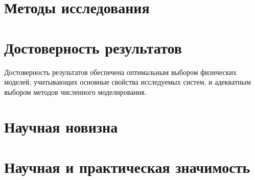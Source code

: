 \section{Методы исследования}

\section{Достоверность результатов}

Достоверность результатов обеспечена оптимальным выбором физических моделей, 
учитывающих основные свойства исследуемых систем, и адекватным выбором 
методов численного моделирования.

\section{Научная новизна}

\section{Научная и практическая значимость}